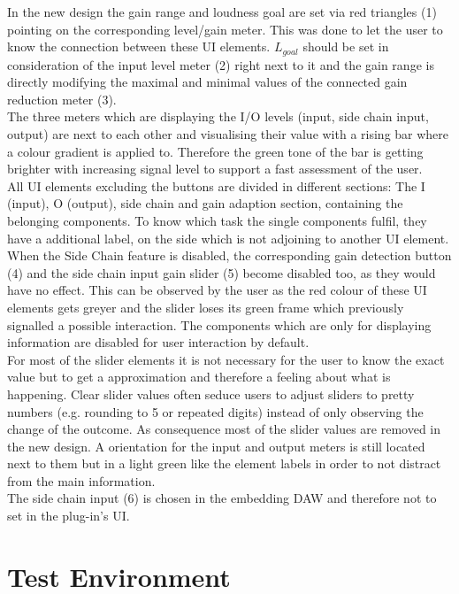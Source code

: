 In the new design the gain range and loudness goal are set via red triangles (1) pointing on the corresponding level/gain meter. This was done to let the user to know the connection between these UI elements. $L_{goal}$ should be set in consideration of the input level meter (2) right next to it and the gain range is directly modifying the maximal and minimal values of the connected gain reduction meter (3).\\
The three meters which are displaying the I/O levels (input, side chain input, output) are next to each other and visualising their value with a rising bar where a colour gradient is applied to. Therefore the green tone of the bar is getting brighter with increasing signal level to support a fast assessment of the user.\\
All UI elements excluding the buttons are divided in different sections: The I (input), O (output), side chain and gain adaption section, containing the belonging components. To know which task the single components fulfil, they have a additional label, on the side which is not adjoining to another UI element.\\
When the Side Chain feature is disabled, the corresponding gain detection button (4) and the side chain input gain slider (5) become disabled too, as they would have no effect. This can be observed by the user as the red colour of these UI elements gets greyer and the slider loses its green frame which previously signalled a possible interaction. The components which are only for displaying information are disabled for user interaction by default.\\
For most of the slider elements it is not necessary for the user to know the exact value but to get a approximation and therefore a feeling about what is happening. Clear slider values often seduce users to adjust sliders to pretty numbers (e.g. rounding to 5 or repeated digits) instead of only observing the change of the outcome. As consequence most of the slider values are removed in the new design. A orientation for the input and output meters is still located next to them but in a light green like the element labels in order to not distract from the main information.\\
The side chain input (6) is chosen in the embedding DAW and therefore not to set in the plug-in’s UI.\\

\section{Test Environment}

